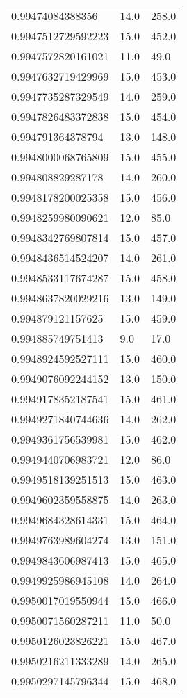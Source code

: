 \begin{center}
\begin{supertabular}[H]{p{0.30\textwidth}p{0.05\textwidth}p{0.05\textwidth}}
0.99474084388356 & 14.0 & 258.0 \\ 
0.9947512729592223 & 15.0 & 452.0 \\ 
0.9947572820161021 & 11.0 & 49.0 \\ 
0.9947632719429969 & 15.0 & 453.0 \\ 
0.9947735287329549 & 14.0 & 259.0 \\ 
0.9947826483372838 & 15.0 & 454.0 \\ 
0.994791364378794 & 13.0 & 148.0 \\ 
0.9948000068765809 & 15.0 & 455.0 \\ 
0.994808829287178 & 14.0 & 260.0 \\ 
0.9948178200025358 & 15.0 & 456.0 \\ 
0.9948259980090621 & 12.0 & 85.0 \\ 
0.9948342769807814 & 15.0 & 457.0 \\ 
0.9948436514524207 & 14.0 & 261.0 \\ 
0.9948533117674287 & 15.0 & 458.0 \\ 
0.9948637820029216 & 13.0 & 149.0 \\ 
0.994879121157625 & 15.0 & 459.0 \\ 
0.994885749751413 & 9.0 & 17.0 \\ 
0.9948924592527111 & 15.0 & 460.0 \\ 
0.9949076092244152 & 13.0 & 150.0 \\ 
0.9949178352187541 & 15.0 & 461.0 \\ 
0.9949271840744636 & 14.0 & 262.0 \\ 
0.9949361756539981 & 15.0 & 462.0 \\ 
0.9949440706983721 & 12.0 & 86.0 \\ 
0.9949518139251513 & 15.0 & 463.0 \\ 
0.9949602359558875 & 14.0 & 263.0 \\ 
0.9949684328614331 & 15.0 & 464.0 \\ 
0.9949763989604274 & 13.0 & 151.0 \\ 
0.9949843606987413 & 15.0 & 465.0 \\ 
0.9949925986945108 & 14.0 & 264.0 \\ 
0.9950017019550944 & 15.0 & 466.0 \\ 
0.9950071560287211 & 11.0 & 50.0 \\ 
0.9950126023826221 & 15.0 & 467.0 \\ 
0.9950216211333289 & 14.0 & 265.0 \\ 
0.9950297145796344 & 15.0 & 468.0 \\ 

\end{supertabular}
\end{center}
